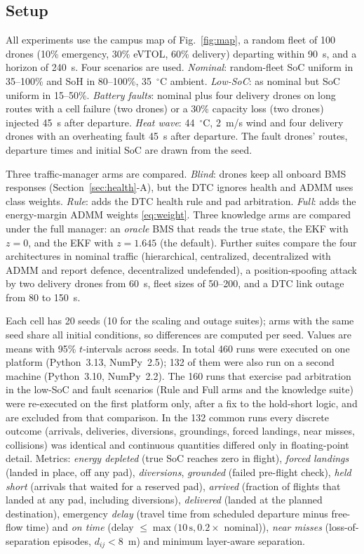 \documentclass[journal]{IEEEtran}
\begin{document}
\subsection{Setup}
All experiments use the campus map of Fig.~\ref{fig:map}, a random fleet of 100 drones (10\% emergency, 30\% eVTOL, 60\% delivery) departing within 90~s, and a horizon of 240~s. Four scenarios are used. \emph{Nominal}: random-fleet SoC uniform in 35--100\% and SoH in 80--100\%, 35~$^\circ$C ambient. \emph{Low-SoC}: as nominal but SoC uniform in 15--50\%. \emph{Battery faults}: nominal plus four delivery drones on long routes with a cell failure (two drones) or a 30\% capacity loss (two drones) injected 45~s after departure. \emph{Heat wave}: 44~$^\circ$C, 2~m/s wind and four delivery drones with an overheating fault 45~s after departure. The fault drones' routes, departure times and initial SoC are drawn from the seed.

Three traffic-manager arms are compared. \emph{Blind}: drones keep all onboard BMS responses (Section~\ref{sec:health}-A), but the DTC ignores health and ADMM uses class weights. \emph{Rule}: adds the DTC health rule and pad arbitration. \emph{Full}: adds the energy-margin ADMM weights \eqref{eq:weight}. Three knowledge arms are compared under the full manager: an \emph{oracle} BMS that reads the true state, the EKF with $z = 0$, and the EKF with $z = 1.645$ (the default). Further suites compare the four architectures in nominal traffic (hierarchical, centralized, decentralized with ADMM and report defence, decentralized undefended), a position-spoofing attack by two delivery drones from 60~s, fleet sizes of 50--200, and a DTC link outage from 80 to 150~s.

Each cell has 20 seeds (10 for the scaling and outage suites); arms with the same seed share all initial conditions, so differences are computed per seed. Values are means with 95\% $t$-intervals across seeds. In total 460 runs were executed on one platform (Python~3.13, NumPy~2.5); 132 of them were also run on a second machine (Python~3.10, NumPy~2.2). The 160 runs that exercise pad arbitration in the low-SoC and fault scenarios (Rule and Full arms and the knowledge suite) were re-executed on the first platform only, after a fix to the hold-short logic, and are excluded from that comparison. In the 132 common runs every discrete outcome (arrivals, deliveries, diversions, groundings, forced landings, near misses, collisions) was identical and continuous quantities differed only in floating-point detail. Metrics: \emph{energy depleted} (true SoC reaches zero in flight), \emph{forced landings} (landed in place, off any pad), \emph{diversions}, \emph{grounded} (failed pre-flight check), \emph{held short} (arrivals that waited for a reserved pad), \emph{arrived} (fraction of flights that landed at any pad, including diversions), \emph{delivered} (landed at the planned destination), emergency \emph{delay} (travel time from scheduled departure minus free-flow time) and \emph{on time} (delay $\le \max(10\,\mathrm{s}, 0.2 \times$ nominal)), \emph{near misses} (loss-of-separation episodes, $d_{ij} < 8$~m) and minimum layer-aware separation.
\end{document}
